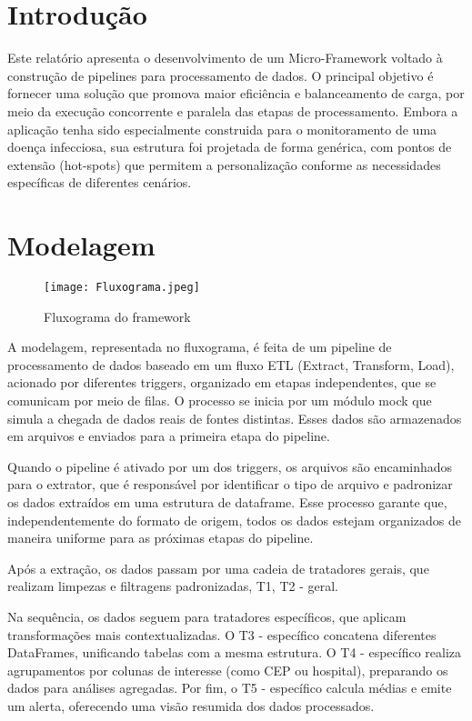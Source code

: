 \documentclass[a4paper,12pt]{article}
\begin{document}
\tableofcontents
\newpage


\section{Introdução}
Este relatório apresenta o desenvolvimento de um Micro-Framework voltado à construção de pipelines para processamento de dados. O principal objetivo é fornecer uma solução que promova maior eficiência e balanceamento de carga, por meio da execução concorrente e paralela das etapas de processamento. Embora a aplicação tenha sido especialmente construida para o monitoramento de uma doença infecciosa, sua estrutura foi projetada de forma genérica, com pontos de extensão (hot-spots) que permitem a personalização conforme as necessidades específicas de diferentes cenários.

\section{Modelagem}

\begin{figure}[H]
    \hspace{-1cm}
    \texttt{[image: Fluxograma.jpeg]}
    \caption{Fluxograma do framework}
    \label{fig:minha_imagem}
\end{figure}

A modelagem, representada no fluxograma, é feita de um pipeline de processamento de dados baseado em um fluxo ETL (Extract, Transform, Load), acionado por diferentes triggers, organizado em etapas independentes, que se comunicam por meio de filas. O processo se inicia por um módulo mock que simula a chegada de dados reais de fontes distintas. Esses dados são armazenados em arquivos e enviados para a primeira etapa do pipeline.

Quando o pipeline é ativado por um dos triggers, os arquivos são encaminhados para o extrator, que é responsável por identificar o tipo de arquivo e padronizar os dados extraídos em uma estrutura de dataframe. Esse processo garante que, independentemente do formato de origem, todos os dados estejam organizados de maneira uniforme para as próximas etapas do pipeline.

Após a extração, os dados passam por uma cadeia de tratadores gerais, que realizam limpezas e filtragens padronizadas, T1, T2 - geral.

Na sequência, os dados seguem para tratadores específicos, que aplicam transformações mais contextualizadas. O T3 - específico concatena diferentes DataFrames, unificando tabelas com a mesma estrutura. O T4 - específico realiza agrupamentos por colunas de interesse (como CEP ou hospital), preparando os dados para análises agregadas. Por fim, o T5 - específico calcula médias e emite um alerta, oferecendo uma visão resumida dos dados processados.
\end{document}
